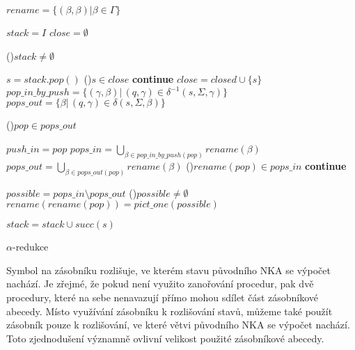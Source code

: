         \begin{algorithm}[h]
            \scriptsize
            \DontPrintSemicolon
            \setcounter{AlgoLine}{0}

            \vspace{0.2cm}
            $rename = \{(\beta, \beta) | \beta \in \Gamma\}$\;

            $stack = I$
            $close = \emptyset$\;

            \While(){$stack \neq \emptyset$}
            {
                $s = stack.pop()$\;
                \If(){$s \in close$}
                {
                    \textbf{continue}\;
                }
                $close = closed \cup \{s\}$\;
                $pop\_in\_by\_push = \{(\gamma, \beta) |\, (q, \gamma) \in \delta^{-1}(s, \Sigma, \gamma)\}$\;
                $pops\_out = \{\beta |\, (q, \gamma) \in \delta(s, \Sigma, \beta)\}$\;

                \ForAll(){$pop \in pops\_out$}
                {
                    $push\_in = pop$\;
                    $pops\_in = \bigcup_{\beta \in pop\_in\_by\_push(pop)} rename(\beta)$\;
                    $pops\_out = \bigcup_{\beta \in pops\_out(pop)} rename(\beta)$\;
                    \If(){$rename(pop) \in pops\_in$}
                    {
                        \textbf{continue}\;
                    }

                    $possible = pops\_in \setminus pops\_out$\;
                    \If(){$possible \neq \emptyset$}
                    {
                        $rename(rename(pop)) = pict\_one(possible)$\;
                    }
                }

                $stack = stack \cup succ(s)$\;

            }
            \;


            \normalsize
            \caption{$\alpha$-redukce}
            \label{betaReduction-Alg}
        \end{algorithm}

        Symbol na zásobníku rozlišuje, ve kterém stavu původního NKA se výpočet nachází. Je zřejmé, že pokud není využito zanořování procedur, pak dvě procedury, které na sebe nenavazují přímo mohou sdílet část zásobníkové abecedy. Místo využívání zásobníku k rozlišování stavů, můžeme také použít zásobník pouze k rozlišování, ve které větvi původního NKA se výpočet nachází. Toto zjednodušení významně ovlivní velikost použité zásobníkové abecedy.

